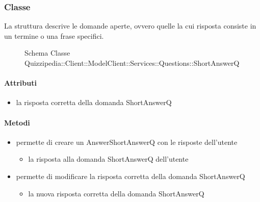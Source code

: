 \subsubsection{Classe }
La struttura descrive le domande aperte, ovvero quelle la cui risposta consiste in un termine o una frase specifici.
\begin{figure}[H]
\centering
\noindent{}
\caption[Schema Classe ShortAnswerQ]{Schema Classe Quizzipedia::Client::ModelClient::Services::Questions::ShortAnswerQ}
\end{figure}
\paragraph{Attributi}
\begin{itemize}
\item {}
\newline
la risposta corretta della domanda ShortAnswerQ
\end{itemize}
\paragraph{Metodi}
\begin{itemize}
\item {}
\newline
permette di creare un AnswerShortAnswerQ con le risposte dell'utente
\newline
{}
\newline
\begin{itemize}
\item {}
\newline
la risposta alla domanda ShortAnswerQ dell'utente
\end{itemize}
\item {}
\newline
permette di modificare la risposta corretta della domanda ShortAnswerQ
\newline
{}
\newline
\begin{itemize}
\item {}
\newline
la nuova risposta corretta della domanda ShortAnswerQ
\end{itemize}
\end{itemize}
